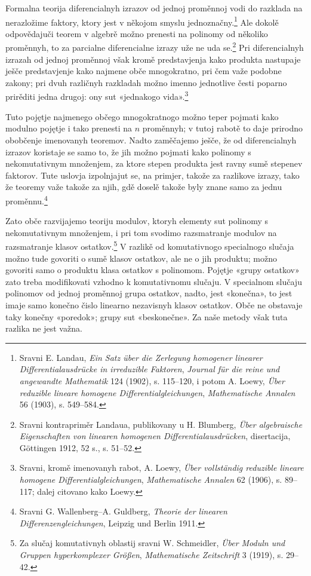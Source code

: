 \documentclass[11pt]{article}
\begin{document}
Formalna teorija diferencialnyh izrazov od jednoj proměnnoj vodi do razklada na nerazložime faktory, ktory jest v někojom smyslu jednoznačny.\footnote{Sravni E. Landau, \emph{Ein Satz über die Zerlegung homogener linearer Differentialausdrücke in irreduzible Faktoren}, \emph{Journal für die reine und angewandte Mathematik} 124 (1902), s. 115--120, i potom A. Loewy, \emph{Über reduzible lineare homogene Differentialgleichungen}, \emph{Mathematische Annalen} 56 (1903), s. 549--584.} Ale dokolě odpovědajuči teorem v algebrě možno prenesti na polinomy od několiko proměnnyh, to za parcialne diferencialne izrazy uže ne uda se.\footnote{Sravni kontrapriměr Landaua, publikovany u H. Blumberg, \emph{Über algebraische Eigenschaften von linearen homogenen Differentialausdrücken}, disertacija, Göttingen 1912, 52 s., s. 51--52.} Pri diferencialnyh izrazah od jednoj proměnnoj však kromě predstavjenja kako produkta nastupaje ješče predstavjenje kako najmene obče mnogokratno, pri čem važe podobne zakony; pri dvuh različnyh razkladah možno imenno jednotlive česti poparno prirěditi jedna drugoj: ony sut «jednakogo vida».\footnote{Sravni, kromě imenovanyh rabot, A. Loewy, \emph{Über vollständig reduzible lineare homogene Differentialgleichungen}, \emph{Mathematische Annalen} 62 (1906), s. 89--117; dalej citovano kako Loewy.}

Tuto pojętje najmenego občego mnogokratnogo možno teper pojmati kako modulno pojętje i tako prenesti na \(n\) proměnnyh; v tutoj rabotě to daje prirodno obobčenje imenovanyh teoremov. Nadto zaměčajemo ješče, že od diferencialnyh izrazov koristaje se samo to, že jih možno pojmati kako polinomy s nekomutativnym množenjem, za ktore stepen produkta jest ravny sumě stepenev faktorov. Tute uslovja izpolnjajut se, na primjer, takože za razlikove izrazy, tako že teoremy važe takože za njih, gdě doselě takože byly znane samo za jednu proměnnu.\footnote{Sravni G. Wallenberg--A. Guldberg, \emph{Theorie der linearen Differenzengleichungen}, Leipzig und Berlin 1911.}

Zato obče razvijajemo teoriju modulov, ktoryh elementy sut polinomy s nekomutativnym množenjem, i pri tom svodimo razsmatranje modulov na razsmatranje klasov ostatkov.\footnote{Za slučaj komutativnyh oblastij sravni W. Schmeidler, \emph{Über Moduln und Gruppen hyperkomplexer Größen}, \emph{Mathematische Zeitschrift} 3 (1919), s. 29--42.} V razlikě od komutativnogo specialnogo slučaja možno tude govoriti o sumě klasov ostatkov, ale ne o jih produktu; možno govoriti samo o produktu klasa ostatkov s polinomom. Pojętje «grupy ostatkov» zato treba modifikovati vzhodno k komutativnomu slučaju. V specialnom slučaju polinomov od jednoj proměnnoj grupa ostatkov, nadto, jest «konečna», to jest imaje samo konečno čislo linearno nezavisnyh klasov ostatkov. Obče ne obstavaje taky konečny «poredok»; grupy sut «beskonečne». Za naše metody však tuta razlika ne jest važna.
\end{document}
